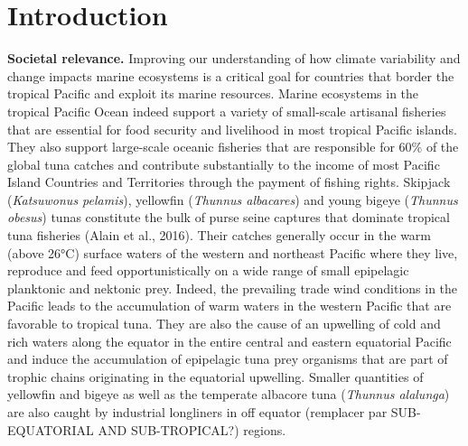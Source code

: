 \section{Introduction}

\textbf{Societal relevance.} Improving our understanding of how climate variability and change impacts marine ecosystems is a critical goal for countries that border the tropical Pacific and exploit its marine resources. Marine ecosystems in the tropical Pacific Ocean indeed support a variety of small-scale artisanal fisheries that are essential for food security and livelihood in most tropical Pacific islands. They also support large-scale oceanic fisheries that are responsible for 60\% of the global tuna catches and  contribute substantially to the income of most Pacific Island Countries and Territories through the payment of fishing rights. Skipjack (\textit{Katsuwonus pelamis}), yellowfin (\textit{Thunnus albacares}) and young bigeye (\textit{Thunnus obesus}) tunas constitute the bulk of purse seine captures that dominate tropical tuna fisheries (Alain et al., 2016). Their catches generally occur in the warm (above 26°C) surface waters of the western and northeast Pacific where they live, reproduce and feed opportunistically on a wide range of small epipelagic planktonic and nektonic prey. Indeed, the prevailing trade wind conditions in the Pacific leads to the accumulation of warm waters in the western Pacific that are favorable to tropical tuna. They are also the cause of an upwelling of cold and rich waters along the equator in the entire central and eastern equatorial Pacific and induce the accumulation of epipelagic tuna prey organisms that are part of trophic chains originating in the equatorial upwelling. Smaller quantities of yellowfin and bigeye as well as the temperate albacore tuna (\textit{Thunnus alalunga}) are also caught by industrial longliners in off equator (remplacer par SUB-EQUATORIAL AND SUB-TROPICAL?)  regions.

